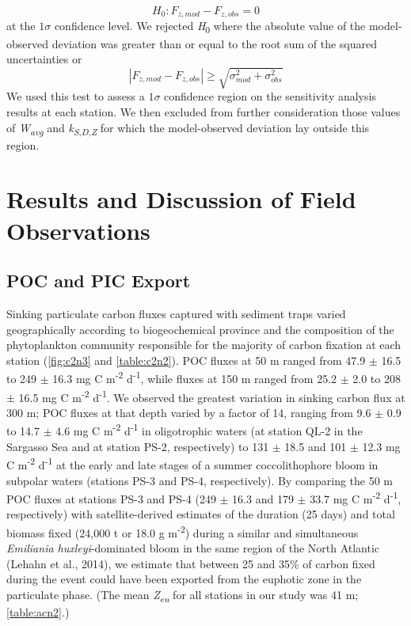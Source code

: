 \begin{equation} \label{eq:c2e7}
{H_0}:{F_{z,mod}} - {F_{z,obs}} = 0
\end{equation} 
at the $1\sigma$ confidence level. We rejected \emph{H}\textsubscript{0} where the absolute value of the model-observed deviation was greater than or equal to the root sum of the squared uncertainties or
\begin{equation} \label{eq:c2e8}
\left| {{F_{z,mod}} - {F_{z,obs}}} \right| \geq \sqrt {\sigma _{mod}^2 + \sigma _{obs}^2}
\end{equation} 
We used this test to assess a $1\sigma$ confidence region on the sensitivity analysis results at each station. We then excluded from further consideration those values of \emph{W\textsubscript{avg}} and \emph{k\textsubscript{S}}\textsubscript{,\emph{D},\emph{Z}} for which the model-observed deviation lay outside this region.

\section{Results and Discussion of Field Observations}

\subsection{POC and PIC Export}

Sinking particulate carbon fluxes captured with sediment traps varied geographically according to biogeochemical province and the composition of the phytoplankton community responsible for the majority of carbon fixation at each station (\autoref{fig:c2n3} and \autoref{table:c2n2}). POC fluxes at 50 m ranged from 47.9 $\pm$ 16.5 to 249 $\pm$ 16.3 mg C m\textsuperscript{-2} d\textsuperscript{-1}, while fluxes at 150 m ranged from 25.2 $\pm$ 2.0 to 208 $\pm$ 16.5 mg C m\textsuperscript{-2} d\textsuperscript{-1}. We observed the greatest variation in sinking carbon flux at 300 m; POC fluxes at that depth varied by a factor of 14, ranging from 9.6 $\pm$ 0.9 to 14.7 $\pm$ 4.6 mg C m\textsuperscript{-2} d\textsuperscript{-1} in oligotrophic waters (at station QL-2 in the Sargasso Sea and at station PS-2, respectively) to 131 $\pm$ 18.5 and 101 $\pm$ 12.3 mg C m\textsuperscript{-2} d\textsuperscript{-1} at the early and late stages of a summer coccolithophore bloom in subpolar waters (stations PS-3 and PS-4, respectively). By comparing the 50 m POC fluxes at stations PS-3 and PS-4 (249 $\pm$ 16.3 and 179 $\pm$ 33.7 mg C m\textsuperscript{-2} d\textsuperscript{-1}, respectively) with satellite-derived estimates of the duration (25 days) and total biomass fixed (24,000 t or 18.0 g m\textsuperscript{-2}) during a similar and simultaneous \emph{Emiliania huxleyi}-dominated bloom in the same region of the North Atlantic (Lehahn et al., 2014), we estimate that between 25 and 35\% of carbon fixed during the event could have been exported from the euphotic zone in the particulate phase. (The mean \emph{Z\textsubscript{eu}} for all stations in our study was 41 m; \autoref{table:acn2}.)

